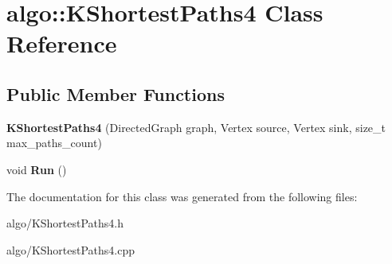 \hypertarget{classalgo_1_1KShortestPaths4}{}\section{algo\+:\+:K\+Shortest\+Paths4 Class Reference}
\label{classalgo_1_1KShortestPaths4}
\subsection*{Public Member Functions}
\begin{DoxyCompactItemize}
\item 
{\bfseries K\+Shortest\+Paths4} (Directed\+Graph graph, Vertex source, Vertex sink, size\+\_\+t max\+\_\+paths\+\_\+count)\hypertarget{classalgo_1_1KShortestPaths4_a30d39b3cfb12803968b7e49031617544}{}\label{classalgo_1_1KShortestPaths4_a30d39b3cfb12803968b7e49031617544}

\item 
void {\bfseries Run} ()\hypertarget{classalgo_1_1KShortestPaths4_a6a3045a52f72ae9b68b47342af12ad75}{}\label{classalgo_1_1KShortestPaths4_a6a3045a52f72ae9b68b47342af12ad75}

\end{DoxyCompactItemize}


The documentation for this class was generated from the following files\+:\begin{DoxyCompactItemize}
\item 
algo/K\+Shortest\+Paths4.\+h\item 
algo/K\+Shortest\+Paths4.\+cpp\end{DoxyCompactItemize}
